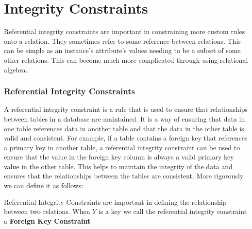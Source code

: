 \documentclass{report}
\begin{document}
     \section{Integrity Constraints}
     \par Referential integrity constraints are important in constraining more custom rules onto a relation. They sometimes refer to some reference between relations. This can be simple as an instance's attribute's values needing to be a subset of some other relations. This can become much more complicated through using relational algebra.

     \subsubsection{Referential Integrity Constraints}
     \hspace{.5cm} A referential integrity constraint is a rule that is used to ensure that relationships between tables in a database are maintained. It is a way of ensuring that data in one table references data in another table and that the data in the other table is valid and consistent. For example, if a table contains a foreign key that references a primary key in another table, a referential integrity constraint can be used to ensure that the value in the foreign key column is always a valid primary key value in the other table. This helps to maintain the integrity of the data and ensures that the relationships between the tables are consistent. More rigorously we can define it as follows:

     
     \vspace{.5cm}
      
      \par Referential Integrity Constraints are important in defining the relationship between two relations. When $Y$ is a key we call the referential integrity constraint a \textbf{Foreign Key Constraint} 
\end{document}
